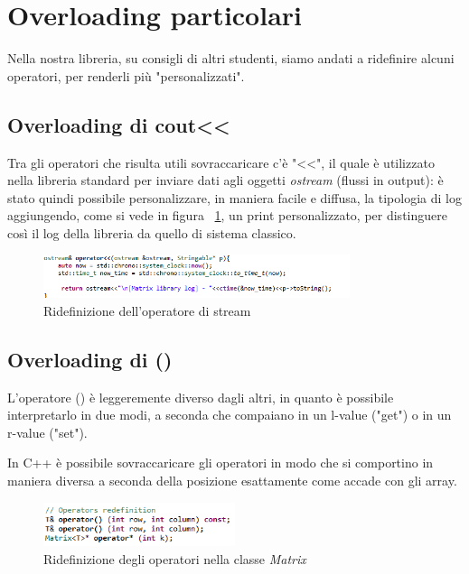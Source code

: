 \section{Overloading particolari}
Nella nostra libreria, su consigli di altri studenti, siamo andati a ridefinire alcuni operatori, per renderli più "personalizzati".
\subsection{Overloading di cout<<}
Tra gli operatori che risulta utili sovraccaricare c'è "<<", il quale è utilizzato nella libreria standard per inviare dati agli oggetti \textit{ostream} (flussi in output): è stato quindi possibile personalizzare, in maniera facile e diffusa, la tipologia di log aggiungendo, come si vede in figura ~\ref{fig:CoutRedef}, un print personalizzato, per distinguere così il log della libreria da quello di sistema classico.

\begin{figure}[h]
	\centering
	\includegraphics[width=0.8\textwidth]{Immagini/CoutRedefinition.png}
	\caption{Ridefinizione dell'operatore di stream}
	\label{fig:CoutRedef}
\end{figure}

\subsection{Overloading di ()}
L'operatore () è leggeremente diverso dagli altri, in quanto è possibile interpretarlo in due modi, a seconda che compaiano in un l-value ("get") o in un r-value ("set").

In C++ è possibile sovraccaricare gli operatori in modo che si comportino in maniera diversa a seconda della posizione esattamente come accade con gli array.

\begin{figure}[h]
	\centering
	\includegraphics[width=0.5\textwidth]{Immagini/MatrixOperatorsRedef.png}
	\caption{Ridefinizione degli operatori nella classe \textit{Matrix}}
	\label{fig:MatrixOperatorRedef}
\end{figure}

